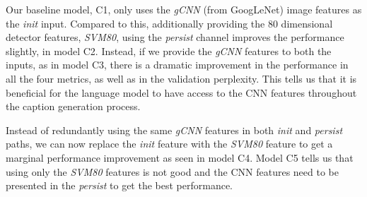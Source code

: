 Our baseline model, C1, only uses the \emph{gCNN} (from GoogLeNet) image
features as the \emph{init} input.
Compared to this, additionally providing the 80 dimensional detector features,
\emph{SVM80},
using the \emph{persist} channel improves the performance slightly, in model C2.
Instead, if we provide the \emph{gCNN} features to both the inputs, as in model C3,
there is a dramatic improvement in the performance in all the four metrics, as
well as in the validation perplexity.
This tells us that it is beneficial for the language model to have access to the
CNN features throughout the caption generation process.

Instead of redundantly using the same \emph{gCNN} features in both \emph{init} and
\emph{persist} paths, we can now replace the \emph{init} feature with the \emph{SVM80}
feature to get a marginal performance improvement as seen in model C4.
Model C5 tells us that using only the \emph{SVM80} features is not good and the CNN
features need to be presented in the \emph{persist} to get the best performance. 

